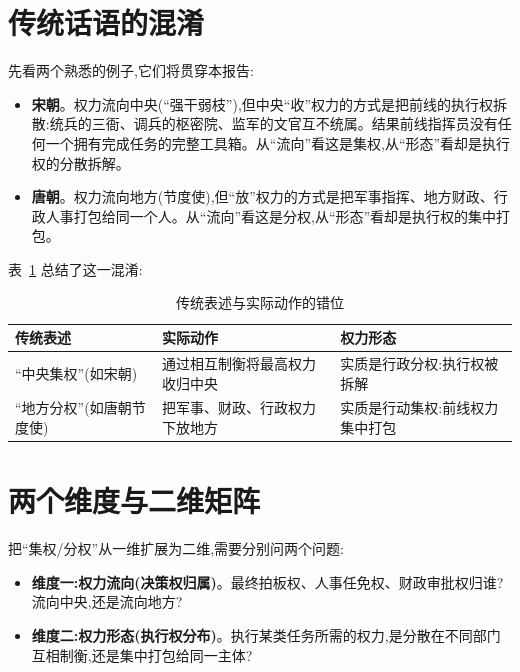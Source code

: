 \documentclass[UTF8,12pt,a4paper]{ctexrep}
\begin{document}
\section{传统话语的混淆}

先看两个熟悉的例子,它们将贯穿本报告:

\begin{itemize}
  \item \textbf{宋朝}。权力流向中央(``强干弱枝''),但中央``收''权力的方式是把前线的执行权拆散:统兵的三衙、调兵的枢密院、监军的文官互不统属。结果前线指挥员没有任何一个拥有完成任务的完整工具箱。从``流向''看这是集权,从``形态''看却是执行权的分散拆解。
  \item \textbf{唐朝}。权力流向地方(节度使),但``放''权力的方式是把军事指挥、地方财政、行政人事打包给同一个人。从``流向''看这是分权,从``形态''看却是执行权的集中打包。
\end{itemize}

表~\ref{tab:mixup} 总结了这一混淆:

\begin{table}[htbp]
  \centering
  \small
  \caption{传统表述与实际动作的错位}
  \label{tab:mixup}
  \begin{tabularx}{\linewidth}{@{}p{3.2cm}XX@{}}
    \toprule
    \textbf{传统表述} & \textbf{实际动作} & \textbf{权力形态} \\
    \midrule
    ``中央集权''(如宋朝) & 通过相互制衡将最高权力收归中央 & 实质是行政分权:执行权被拆解 \\
    ``地方分权''(如唐朝节度使) & 把军事、财政、行政权力下放地方 & 实质是行动集权:前线权力集中打包 \\
    \bottomrule
  \end{tabularx}
\end{table}

\section{两个维度与二维矩阵}

把``集权/分权''从一维扩展为二维,需要分别问两个问题:

\begin{itemize}
  \item \textbf{维度一:权力流向(决策权归属)}。最终拍板权、人事任免权、财政审批权归谁?流向中央,还是流向地方?
  \item \textbf{维度二:权力形态(执行权分布)}。执行某类任务所需的权力,是分散在不同部门互相制衡,还是集中打包给同一主体?
\end{itemize}
\end{document}
